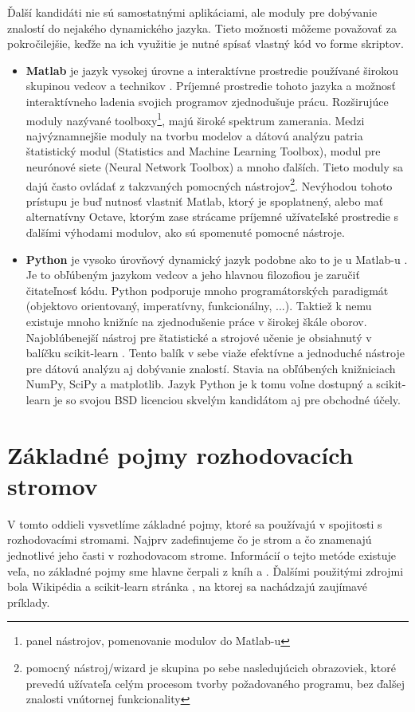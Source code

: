 Ďalší kandidáti nie sú samostatnými aplikáciami, ale moduly pre dobývanie znalostí do nejakého dynamického jazyka. Tieto možnosti môžeme považovať za pokročilejšie, keďže na ich využitie je nutné spísať vlastný kód vo forme skriptov.
\begin{itemize}
\item \textbf{Matlab} je jazyk vysokej úrovne a interaktívne prostredie používané širokou skupinou vedcov a technikov \cite{online-DataMiningMatlab}. Príjemné prostredie tohoto jazyka a možnosť interaktívneho ladenia svojich programov zjednodušuje prácu. Rozširujúce moduly nazývané toolboxy\footnote{panel nástrojov, pomenovanie modulov do Matlab-u}, majú široké spektrum zamerania. Medzi najvýznamnejšie moduly na tvorbu modelov a dátovú analýzu pat\-ria štatistický modul (Statistics and Machine Learning Toolbox), modul pre neu\-rónové siete (Neural Network Toolbox) a mnoho ďalších. Tieto moduly sa dajú často ovládať z takzvaných pomocných nástrojov\footnote{pomocný nástroj/wizard je skupina po sebe nasledujúcich obrazoviek, ktoré prevedú užívateľa celým procesom tvorby požadovaného programu, bez ďalšej znalosti vnútornej funkcionality}.
Nevýhodou tohoto prístupu je buď nutnosť vlastniť Matlab, ktorý je spoplatnený, alebo mať alternatívny Octave, ktorým zase strácame príjemné užívateľské prostredie s ďalšími výhodami modulov, ako sú spomenuté pomocné nástroje.
\item \textbf{Python} je vysoko úrovňový dynamický jazyk podobne ako to je u Matlab-u \cite{wiki-Python}. Je to obľúbeným jazykom vedcov a jeho hlavnou filozofiou je zaručiť čitateľnosť kódu. Python podporuje mnoho programátorských paradigmát (objektovo orientovaný, imperatívny, funkcionálny, ...). Taktiež k nemu existuje mnoho knižníc na zjednodušenie práce v širokej škále oborov. Najoblúbenejší nástroj pre štatistické a strojové učenie je obsiahnutý v balíčku scikit-learn \cite{kap1-Scikit}. Tento balík v sebe viaže efektívne a jednoduché nástroje pre dátovú analýzu aj dobývanie znalostí. Stavia na obľúbených knižniciach NumPy, SciPy a matplotlib. Jazyk Python je k tomu voľne dostupný a scikit-learn je so svojou BSD licenciou skvelým kandidátom aj pre obchodné účely. 
\end{itemize}


\section{Základné pojmy rozhodovacích stromov}\label{kap1:2.3:DT}
V tomto oddieli vysvetlíme základné pojmy, ktoré sa používajú v spojitosti s rozhodovacími stromami. Najprv zadefinujeme čo je strom a čo znamenajú jednotlivé jeho časti v rozhodovacom strome. Informácií o tejto metóde existuje veľa, no základné pojmy sme hlavne čerpali z kníh \cite{kap1-DataMiningForTrees,kap1-DecisionTree} a \cite[s. 481-498]{kap1-DataMiningAndAnalysis}. Ďalšími použitými zdrojmi bola Wikipédia \cite{wiki-DecisionTree} a scikit-learn stránka \cite{online-DecisionTreeScikit}, na ktorej sa nachádzajú zaujímavé príklady.


